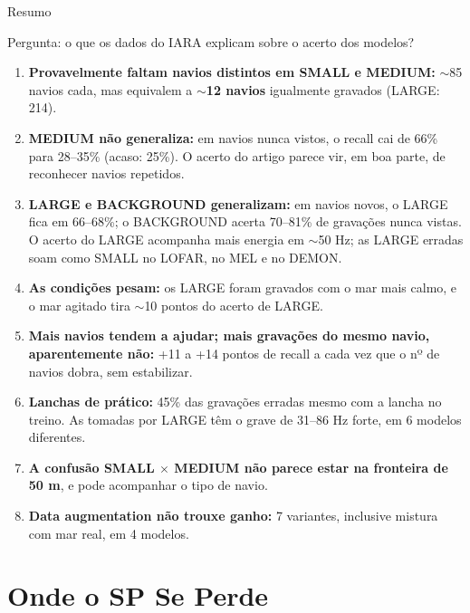 \documentclass[aspectratio=169]{beamer}
\begin{document}
\begin{frame}{Resumo}
    \footnotesize
    \begin{block}{\small Pergunta: o que os dados do IARA explicam sobre o acerto dos modelos?}
        \scriptsize
        \begin{enumerate}
            \setlength{\itemsep}{1pt}
            \item \textbf{Provavelmente faltam navios distintos em SMALL e MEDIUM:} $\sim$85 navios cada, mas equivalem a \textbf{$\sim$12 navios} igualmente gravados (LARGE: 214).
            \item \textbf{MEDIUM não generaliza:} em navios nunca vistos, o recall cai de 66\% para 28--35\% (acaso: 25\%). O acerto do artigo parece vir, em boa parte, de reconhecer navios repetidos.
            \item \textbf{LARGE e BACKGROUND generalizam:} em navios novos, o LARGE fica em 66--68\%; o BACKGROUND acerta 70--81\% de gravações nunca vistas. O acerto do LARGE acompanha mais energia em $\sim$50 Hz; as LARGE erradas soam como SMALL no LOFAR, no MEL e no DEMON.
            \item \textbf{As condições pesam:} os LARGE foram gravados com o mar mais calmo, e o mar agitado tira $\sim$10 pontos do acerto de LARGE.
            \item \textbf{Mais navios tendem a ajudar; mais gravações do mesmo navio, aparentemente não:} +11 a +14 pontos de recall a cada vez que o nº de navios dobra, sem estabilizar.
            \item \textbf{Lanchas de prático:} 45\% das gravações erradas mesmo com a lancha no treino. As tomadas por LARGE têm o grave de 31--86 Hz forte, em 6 modelos diferentes.
            \item \textbf{A confusão SMALL $\times$ MEDIUM não parece estar na fronteira de 50 m}, e pode acompanhar o tipo de navio.
            \item \textbf{Data augmentation não trouxe ganho:} 7 variantes, inclusive mistura com mar real, em 4 modelos.
        \end{enumerate}
    \end{block}
\end{frame}

\section{Onde o SP Se Perde}
\end{document}
